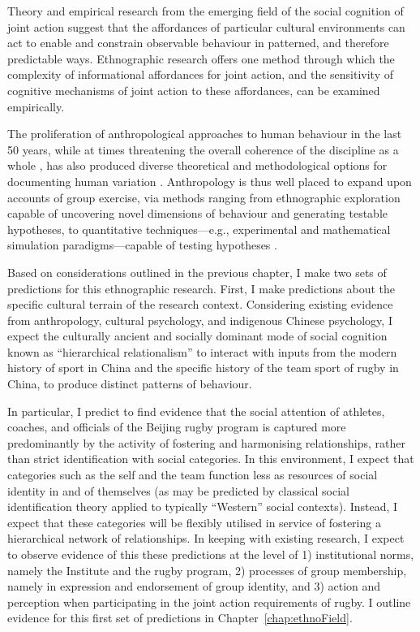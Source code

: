 \begin{CJK}{UTF8}{gbsn}
Theory and empirical research from the emerging field of the social cognition of joint action suggest that the affordances of particular cultural environments can act to enable and constrain observable behaviour in patterned, and therefore predictable ways.   Ethnographic research offers one method through which the complexity of informational affordances for joint action, and the sensitivity of cognitive mechanisms of joint action to these affordances, can be examined empirically.

The proliferation of anthropological approaches to human behaviour in the last 50 years, while at times threatening the overall coherence of the discipline as a whole \citep{Beller2012}, has also produced diverse theoretical and methodological options for documenting human variation \citep{Fuentes2016a}.  Anthropology is thus well placed to expand upon accounts of group exercise, via methods ranging from ethnographic exploration capable of uncovering novel dimensions of behaviour and generating testable hypotheses, to quantitative techniques---e.g., experimental and mathematical simulation paradigms---capable of testing hypotheses \citep{Epstein2006,Fuentes2016}.

Based on considerations outlined in the previous chapter, I make two sets of predictions for this ethnographic research.  First, I make predictions about the specific cultural terrain of the research context.  Considering existing evidence from anthropology, cultural psychology, and indigenous Chinese psychology, I expect the culturally ancient and socially dominant mode of social cognition known as ``hierarchical relationalism'' to interact with inputs from the modern history of sport in China and the specific history of the team sport of rugby in China, to produce distinct patterns of behaviour.

In particular, I predict to find evidence that the social attention of athletes, coaches, and officials of the Beijing rugby program is captured more predominantly by the activity of fostering and harmonising relationships, rather than strict identification with social categories.  In this environment, I expect that categories such as the self and the team function less as resources of social identity in and of themselves (as may be predicted by classical social identification theory applied to typically ``Western'' social contexts).  Instead, I expect that these categories will be flexibly utilised in service of fostering a hierarchical network of relationships.  In keeping with existing research, I expect to observe evidence of this these predictions at the level of 1) institutional norms, namely the Institute and the rugby program, 2) processes of group membership, namely in expression and endorsement of group identity, and 3) action and perception when participating in the joint action requirements of rugby.  I outline evidence for this first set of predictions in Chapter~\ref{chap:ethnoField}.


\end{CJK}
